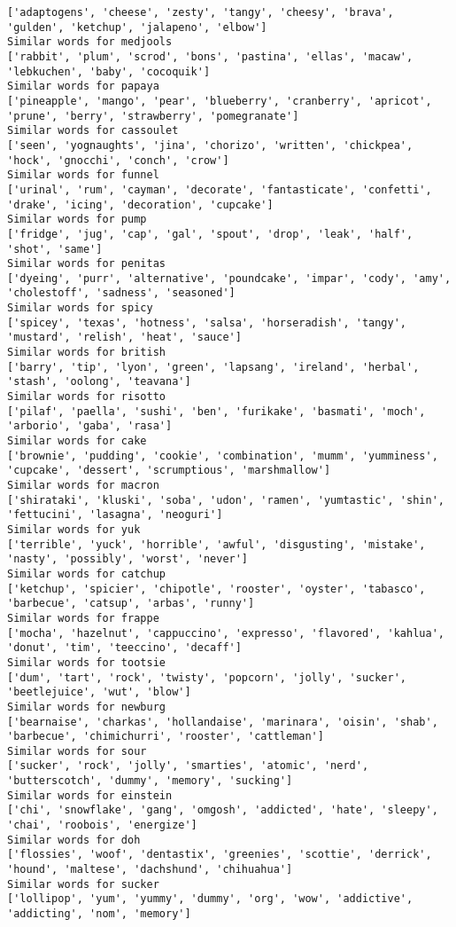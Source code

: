 \documentclass[11pt]{article}
\begin{document}
\begin{Verbatim}[commandchars=\\\{\}]
['adaptogens', 'cheese', 'zesty', 'tangy', 'cheesy', 'brava', 'gulden', 'ketchup', 'jalapeno', 'elbow']
Similar words for medjools
['rabbit', 'plum', 'scrod', 'bons', 'pastina', 'ellas', 'macaw', 'lebkuchen', 'baby', 'cocoquik']
Similar words for papaya
['pineapple', 'mango', 'pear', 'blueberry', 'cranberry', 'apricot', 'prune', 'berry', 'strawberry', 'pomegranate']
Similar words for cassoulet
['seen', 'yognaughts', 'jina', 'chorizo', 'written', 'chickpea', 'hock', 'gnocchi', 'conch', 'crow']
Similar words for funnel
['urinal', 'rum', 'cayman', 'decorate', 'fantasticate', 'confetti', 'drake', 'icing', 'decoration', 'cupcake']
Similar words for pump
['fridge', 'jug', 'cap', 'gal', 'spout', 'drop', 'leak', 'half', 'shot', 'same']
Similar words for penitas
['dyeing', 'purr', 'alternative', 'poundcake', 'impar', 'cody', 'amy', 'cholestoff', 'sadness', 'seasoned']
Similar words for spicy
['spicey', 'texas', 'hotness', 'salsa', 'horseradish', 'tangy', 'mustard', 'relish', 'heat', 'sauce']
Similar words for british
['barry', 'tip', 'lyon', 'green', 'lapsang', 'ireland', 'herbal', 'stash', 'oolong', 'teavana']
Similar words for risotto
['pilaf', 'paella', 'sushi', 'ben', 'furikake', 'basmati', 'moch', 'arborio', 'gaba', 'rasa']
Similar words for cake
['brownie', 'pudding', 'cookie', 'combination', 'mumm', 'yumminess', 'cupcake', 'dessert', 'scrumptious', 'marshmallow']
Similar words for macron
['shirataki', 'kluski', 'soba', 'udon', 'ramen', 'yumtastic', 'shin', 'fettucini', 'lasagna', 'neoguri']
Similar words for yuk
['terrible', 'yuck', 'horrible', 'awful', 'disgusting', 'mistake', 'nasty', 'possibly', 'worst', 'never']
Similar words for catchup
['ketchup', 'spicier', 'chipotle', 'rooster', 'oyster', 'tabasco', 'barbecue', 'catsup', 'arbas', 'runny']
Similar words for frappe
['mocha', 'hazelnut', 'cappuccino', 'expresso', 'flavored', 'kahlua', 'donut', 'tim', 'teeccino', 'decaff']
Similar words for tootsie
['dum', 'tart', 'rock', 'twisty', 'popcorn', 'jolly', 'sucker', 'beetlejuice', 'wut', 'blow']
Similar words for newburg
['bearnaise', 'charkas', 'hollandaise', 'marinara', 'oisin', 'shab', 'barbecue', 'chimichurri', 'rooster', 'cattleman']
Similar words for sour
['sucker', 'rock', 'jolly', 'smarties', 'atomic', 'nerd', 'butterscotch', 'dummy', 'memory', 'sucking']
Similar words for einstein
['chi', 'snowflake', 'gang', 'omgosh', 'addicted', 'hate', 'sleepy', 'chai', 'roobois', 'energize']
Similar words for doh
['flossies', 'woof', 'dentastix', 'greenies', 'scottie', 'derrick', 'hound', 'maltese', 'dachshund', 'chihuahua']
Similar words for sucker
['lollipop', 'yum', 'yummy', 'dummy', 'org', 'wow', 'addictive', 'addicting', 'nom', 'memory']

\end{Verbatim}
\end{document}
